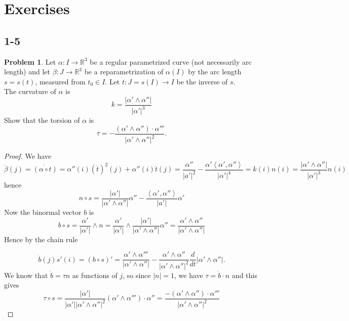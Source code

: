 \documentclass{amsart}
\theoremstyle{definition}
\newtheorem{problem}[theorem]{Problem}
\theoremstyle{remark}
\begin{document}
\section*{Exercises}
\subsection*{1-5}
\begin{problem}
    Let $\alpha \colon I \to \mathbb{R}^3$ be a regular parametrized curve
    (not necessarily arc length) and let $\beta \colon
    J \to \mathbb{R}^3$ be a reparametrization of $\alpha(I)$ by
    the arc length $s = s(t)$, measured from $t_0 \in I$. Let
    $t \colon J = s(I) \to I$ be the inverse of $s$.\\
    The curvature of $\alpha$ is
    \[
    k = \frac{\left| \alpha' \wedge \alpha'' \right| }{\left| 
    \alpha' \right|^3 }
    \] 
    Show that the torsion of $\alpha$ is
    \[
    \tau = - \frac{\left( \alpha' \wedge \alpha'' \right) \cdot 
    \alpha'''}{\left| \alpha' \wedge \alpha'' \right|^2}
    .\] 
\end{problem}

\begin{proof}
 We have
 \[
 \ddot{\beta}(j) = \ddot{\left( \alpha \circ t \right)} = \alpha''(i) (\dot{t})^2(j)
     + \alpha''(i) \ddot{t}(j) 
 = \frac{\alpha''}{\left| a' \right|^2} -
 \frac{\alpha' \left<\alpha', \alpha'' \right>}{\left| \alpha' \right|^{4}}=
 k(i)n(i)
 = \frac{\left| \alpha' \wedge \alpha'' \right| }{\left| \alpha' \right|^3}n(i)
 \] 
 hence
 \[
 n \circ s = \frac{\left| \alpha' \right| }{\left| \alpha' \wedge \alpha'' \right| } 
 \alpha'' - \frac{\left<\alpha', \alpha'' \right>}{\left| a' \right| } \alpha'
 \] 
 Now the binormal vector $b$ is
 \[
 b \circ s = \frac{\alpha'}{\left| \alpha' \right| } \wedge n
 = \frac{\alpha'}{\left| \alpha' \right| } \wedge
 \frac{\left| \alpha' \right| }{\left| \alpha' \wedge \alpha'' \right|
 } \alpha'' =
 \frac{\alpha' \wedge \alpha''}{\left| \alpha' \wedge \alpha'' \right| }
 \] 
 Hence by the chain rule

 \[
 \dot{b}(j) s'(i)= \left( b \circ s \right)' =
 \frac{\alpha' \wedge \alpha'''}{\left| \alpha' \wedge \alpha'' \right| }
 - \frac{\alpha' \wedge \alpha''}{\left| \alpha' \wedge \alpha'' \right|^2}
 \frac{d}{dt} \left| \alpha' \wedge \alpha'' \right|.
 \] 
 We know that $\dot{b} = \tau n$ as functions of $j$,
 so since  $\left| n \right| =1$, we have
 $\tau = \dot{b} \cdot n$ and this gives
 \[
 \tau \circ s = \frac{\left| \alpha' \right| }{\left| \alpha' \right| \left| \alpha' \wedge \alpha'' \right|^2}
 \left( \alpha' \wedge \alpha''' \right) \cdot \alpha''
 =  \frac{- \left( \alpha' \wedge \alpha'' \right) \cdot 
 \alpha'''}{\left| \alpha' \wedge \alpha'' \right|^2}
 \] 
\end{proof}














 
\end{document}
